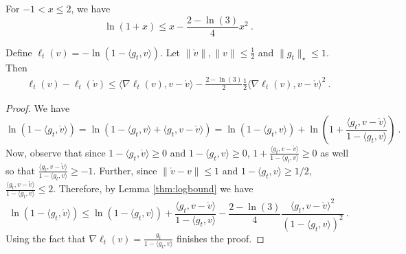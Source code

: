 \documentclass[12pt]{colt2018} %
\renewcommand{\v}{\mathring{v}}
\begin{document}
\begin{lemma}\label{thm:logbound}
\label{eq:upper_bound_log}
For $-1< x\leq2$, we have
\[
\ln(1+x)\leq x-\frac{2-\ln(3)}{4}x^2~.
\]
\end{lemma}

\begin{lemma}\label{thm:beta}
Define $\ell_t(v)=-\ln(1 - \langle g_t, v\rangle )$.
Let $\|\v\|, \|v\| \leq \frac{1}{2}$ and $\|g_t\|_\star  \leq 1$. Then
\begin{align*}
\ell_t(v)-\ell_t(\v)
\leq \langle \nabla \ell_t(v), v-\v \rangle -\frac{2-\ln(3)}{2}\frac{1}{2}\langle \nabla \ell_t(v),v-\v \rangle^2~.
\end{align*}
\end{lemma}
%
\begin{proof}
We have
\[
\ln(1-\langle g_t, \v\rangle ) 
= \ln(1-\langle g_t, v\rangle + \langle g_t, v-\v\rangle )
= \ln(1-\langle  g_t, v\rangle) + \ln\left(1 + \frac{\langle g_t,v-\v\rangle}{1-\langle g_t, v\rangle}\right)~.
\]
Now, observe that since $1-\langle g_t, \v\rangle \ge 0$ and $1-\langle g_t,v \rangle \ge 0$, $1 + \frac{\langle g_t,v-\v\rangle}{1-\langle g_t,v \rangle}\ge 0$ as well so that $\frac{\langle g_t, v-\v\rangle}{1-\langle g_t,v\rangle}\ge -1$. Further, since $\|\v-v\|\le 1$ and $1-\langle g_t, v\rangle\ge 1/2$, $\frac{\langle g_t,v-\v\rangle}{1-\langle g_t, v \rangle}\le 2$. Therefore, by Lemma \ref{thm:logbound} we have
\[
\ln(1-\langle g_t, \v\rangle)
\le \ln(1-\langle g_t, v\rangle) + \frac{\langle g_t, v-\v\rangle}{1-\langle g_t, v\rangle} - \frac{2-\ln(3)}{4} \frac{\langle g_t,v-\v\rangle^2}{(1- \langle g_t, v\rangle)^2}~.
\]
Using the fact that $\nabla \ell_t(v)=\frac{g_t}{1- \langle g_t, v\rangle}$ finishes the proof.
\end{proof}
\end{document}
